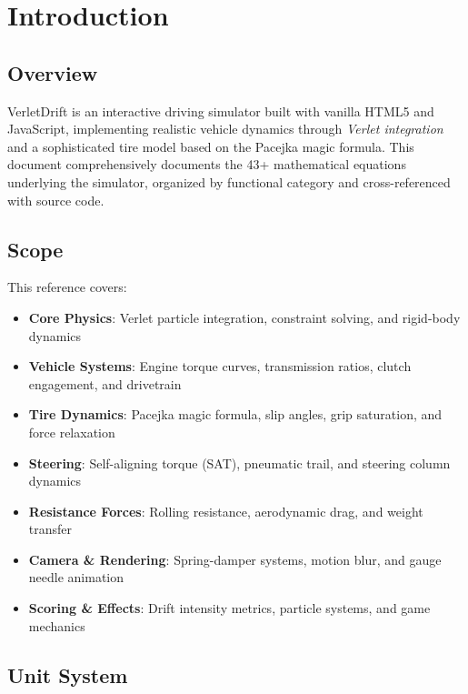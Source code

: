 \section{Introduction}

\subsection{Overview}

VerletDrift is an interactive driving simulator built with vanilla HTML5 and JavaScript, implementing realistic vehicle dynamics through \textit{Verlet integration} and a sophisticated tire model based on the Pacejka magic formula. This document comprehensively documents the 43+ mathematical equations underlying the simulator, organized by functional category and cross-referenced with source code.

\subsection{Scope}

This reference covers:
\begin{itemize}
  \item \textbf{Core Physics}: Verlet particle integration, constraint solving, and rigid-body dynamics
  \item \textbf{Vehicle Systems}: Engine torque curves, transmission ratios, clutch engagement, and drivetrain
  \item \textbf{Tire Dynamics}: Pacejka magic formula, slip angles, grip saturation, and force relaxation
  \item \textbf{Steering}: Self-aligning torque (SAT), pneumatic trail, and steering column dynamics
  \item \textbf{Resistance Forces}: Rolling resistance, aerodynamic drag, and weight transfer
  \item \textbf{Camera \& Rendering}: Spring-damper systems, motion blur, and gauge needle animation
  \item \textbf{Scoring \& Effects}: Drift intensity metrics, particle systems, and game mechanics
\end{itemize}

\subsection{Unit System}

